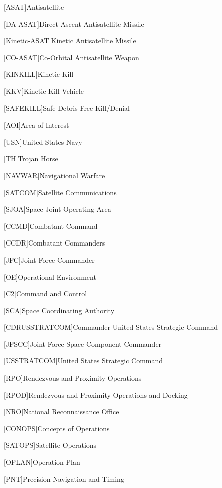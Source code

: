 [ASAT]{Antisatellite}

[DA-ASAT]{Direct Ascent Antisatellite Missile}

[Kinetic-ASAT]{Kinetic Antisatellite Missile}

[CO-ASAT]{Co-Orbital Antisatellite Weapon}

[KINKILL]{Kinetic Kill}

[KKV]{Kinetic Kill Vehicle}

[SAFEKILL]{Safe Debris-Free Kill/Denial}

[AOI]{Area of Interest}

[USN]{United States Navy}

[TH]{Trojan Horse}

[NAVWAR]{Navigational Warfare}

[SATCOM]{Satellite Communications}

[SJOA]{Space Joint Operating Area}

[CCMD]{Combatant Command}

[CCDR]{Combatant Commanders}

[JFC]{Joint Force Commander}

[OE]{Operational Environment}

[C2]{Command and Control}

[SCA]{Space Coordinating Authority}

[CDRUSSTRATCOM]{Commander United States Strategic Command}

[JFSCC]{Joint Force Space Component Commander}

[USSTRATCOM]{United States Strategic Command}

[RPO]{Rendezvous and Proximity Operations}

[RPOD]{Rendezvous and Proximity Operations and Docking}

[NRO]{National Reconnaissance Office}

[CONOPS]{Concepts of Operations}

[SATOPS]{Satellite Operations}

[OPLAN]{Operation Plan}

[PNT]{Precision Navigation and Timing}

